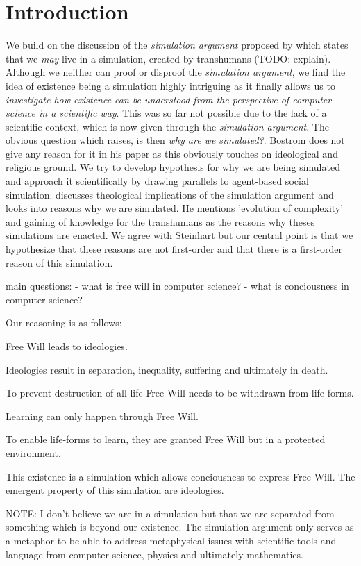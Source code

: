 \section{Introduction}


We build on the discussion of the \textit{simulation argument} proposed by \cite{bostrom_are_2003} which states that we \textit{may} live in a simulation, created by transhumans (TODO: explain). Although we neither can proof or disproof the \textit{simulation argument}, we find the idea of existence being a simulation highly intriguing as it finally allows us to \textit{investigate how existence can be understood from the perspective of computer science in a scientific way}. This was so far not possible due to the lack of a scientific context, which is now given through the \textit{simulation argument}. The obvious question which raises, is then \textit{why are we simulated?}. Bostrom does not give any reason for it in his paper as this obviously touches on ideological and religious ground. We try to develop hypothesis for why we are being simulated and approach it scientifically by drawing parallels to agent-based social simulation.
\cite{steinhart_theological_2010} discusses theological implications of the simulation argument and looks into reasons why we are simulated. He mentions 'evolution of complexity' and gaining of knowledge for the transhumans as the reasons why theses simulations are enacted. We agree with Steinhart but our central point is that we hypothesize that these reasons are not first-order and that there is a first-order reason of this simulation.

main questions: 
	- what is free will in computer science?
	- what is conciousness in computer science?
	
Our reasoning is as follows:

Free Will leads to ideologies.

Ideologies result in separation, inequality, suffering and ultimately in death.

To prevent destruction of all life Free Will needs to be withdrawn from life-forms.

Learning can only happen through Free Will.

To enable life-forms to learn, they are granted Free Will but in a protected environment.

This existence is a simulation which allows conciousness to express Free Will. The emergent property of this simulation are ideologies.

NOTE:  I don't believe we are in a simulation but that we are separated from something which is beyond our existence. The simulation argument only serves as a metaphor to be able to address metaphysical issues with scientific tools and language from computer science, physics and ultimately mathematics.

